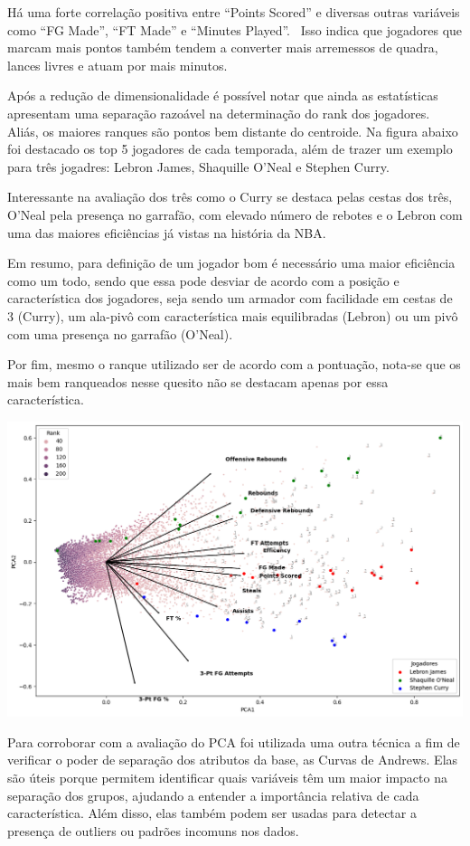 \documentclass[
]{book}
\begin{document}
Há uma forte correlação positiva entre ``Points Scored'' e diversas outras variáveis como ``FG Made'', ``FT Made'' e ``Minutes Played''. ~Isso indica que jogadores que marcam mais pontos também tendem a converter mais arremessos de quadra, lances livres e atuam por mais minutos.

Após a redução de dimensionalidade é possível notar que ainda as estatísticas apresentam uma separação razoável na determinação do rank dos jogadores. Aliás, os maiores ranques são pontos bem distante do centroide. Na figura abaixo foi destacado os top 5 jogadores de cada temporada, além de trazer um exemplo para três jogadres: Lebron James, Shaquille O'Neal e Stephen Curry.

Interessante na avaliação dos três como o Curry se destaca pelas cestas dos três, O'Neal pela presença no garrafão, com elevado número de rebotes e o Lebron com uma das maiores eficiências já vistas na história da NBA.

Em resumo, para definição de um jogador bom é necessário uma maior eficiência como um todo, sendo que essa pode desviar de acordo com a posição e característica dos jogadores, seja sendo um armador com facilidade em cestas de 3 (Curry), um ala-pivô com característica mais equilibradas (Lebron) ou um pivô com uma presença no garrafão (O'Neal).

Por fim, mesmo o ranque utilizado ser de acordo com a pontuação, nota-se que os mais bem ranqueados nesse quesito não se destacam apenas por essa característica.

\includegraphics{imagens/6.png}

Para corroborar com a avaliação do PCA foi utilizada uma outra técnica a fim de verificar o poder de separação dos atributos da base, as Curvas de Andrews. Elas são úteis porque permitem identificar quais variáveis têm um maior impacto na separação dos grupos, ajudando a entender a importância relativa de cada característica. Além disso, elas também podem ser usadas para detectar a presença de outliers ou padrões incomuns nos dados.
\end{document}
